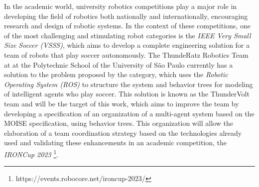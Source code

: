 In the academic world, university robotics competitions play a major role in developing the field of robotics both nationally and internationally, encouraging research and design of robotic systems. In the context of these competitions, one of the most challenging and stimulating robot categories is the \textit{IEEE Very Small Size Soccer (VSSS)}, which aims to develop a complete engineering solution for a team of robots that play soccer autonomously. The ThundeRatz Robotics Team at at the Polytechnic School of the University of São Paulo currently has a solution to the problem proposed by the category, which uses the \textit{Robotic Operating System (ROS)} to structure the system and behavior trees for modeling of intelligent agents who play soccer. This solution is known as the ThunderVolt team and will be the target of this work, which aims to improve the team by developing a specification of an organization of a multi-agent system based on the MOISE specification, using behavior trees. This organization will allow the elaboration of a team coordination strategy based on the technologies already used and validating these enhancements in an academic competition, the \textit{IRONCup 2023} \footnote{https://events.robocore.net/ironcup-2023/}.